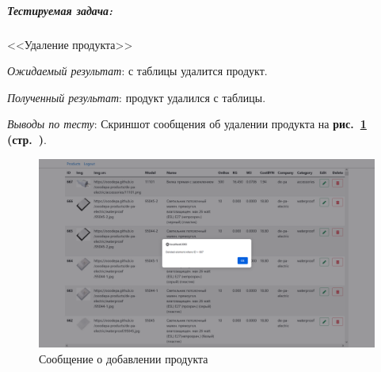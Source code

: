 
\subparagraph{Тестируемая задача:} <<Удаление продукта>>

\textit{Ожидаемый результат}: с таблицы удалится продукт.

\textit{Полученный результат}: продукт удалился с таблицы.

\textit{Выводы по тесту}: 
Скриншот сообщения об удалении продукта на
\textbf{рис.~\ref{fig:gpi_pz_delete_product} (стр.~\pageref{fig:gpi_pz_delete_product})}.

\begin{figure}[!htb]
    \centering
    \includegraphics[width=12cm]
        {_assets/gpi_pz_delete_product.png}
    \caption{Сообщение о добавлении продукта}
    \label{fig:gpi_pz_delete_product}
\end{figure}


\newpage

